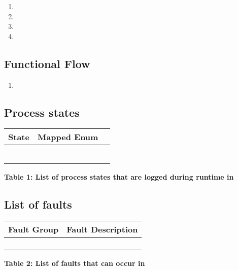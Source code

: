 \begin{enumerate}
	\item 
	\item 
	\item 
	\item 
	
\end{enumerate}

\subsection{Functional Flow}

\begin{enumerate}
	\item
	
\end{enumerate}

\subsection{Process states}

\begin{table}[H]
	\begin{center}
		\begin{tabular}{|p{3 cm}|p{5 cm}|p{5 cm}|}
			\hline
			\textbf{State} & \textbf{Mapped Enum} \\
			\hline
			&  \\
			\hline
			&  \\
			\hline
			&  \\
			\hline
			&  \\
			\hline
			&  \\
			\hline
			&  \\
			\hline
		\end{tabular}
		\begin{center}
			\textbf{Table 1: List of process states that are logged during runtime in }
		\end{center}
	\end{center}
\end{table}

\subsection{List of faults}
\begin{table}[H]
	\begin{center}
		\begin{tabular}{|p{6 cm}|p{8 cm}|}
			\hline
			\textbf{Fault Group} & \textbf{Fault Description}\\
			\hline
			&   \\
			\hline
			&  \\
			\hline
			&  \\
			\hline
			&  \\
			\hline
			
		\end{tabular}
		\begin{center}
			\textbf{Table 2: List of faults that can occur in }
		\end{center}
	\end{center}
\end{table}
\newpage

